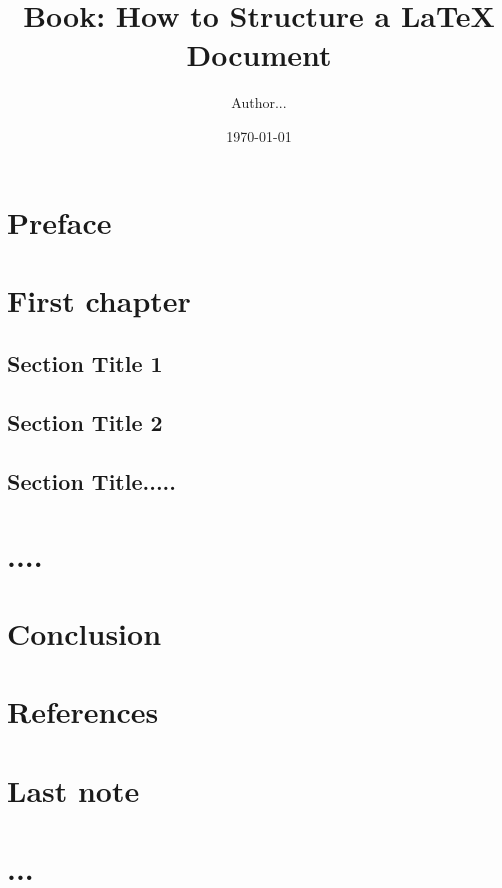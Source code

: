 \documentclass[11pt,a4paper]{book}
\begin{document}
\title{Book: How to Structure a LaTeX Document}
\author{Author...}
\date{\today}

\maketitle

\frontmatter

\chapter{Preface}

\mainmatter
\chapter{First chapter}
\section{Section Title 1}
\section{Section Title 2}

\section{Section Title.....}

\chapter{....}

\chapter{Conclusion}

\chapter*{References}


\backmatter
\chapter{Last note}

\chapter{...}
\end{document}
